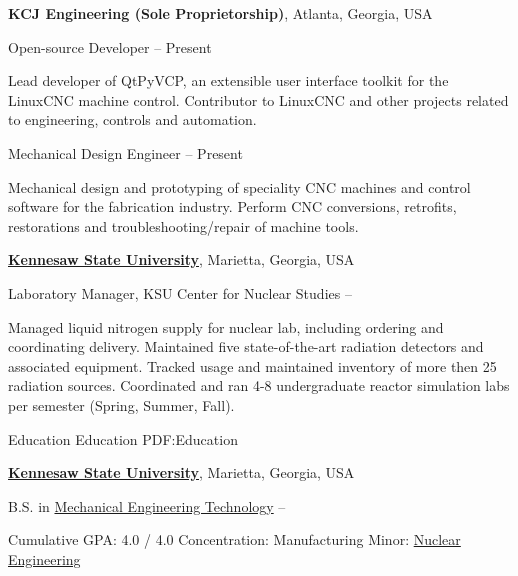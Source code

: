 \documentclass[
letterpaper,
MMMyyyy,
nonstopmode,
]{resume}
\begin{document}
\begin{Body}
\BigGap


\Entry
\textbf{KCJ Engineering (Sole Proprietorship)},
Atlanta, Georgia, USA

\Gap
\BulletItem
Open-source Developer
\hfill
{} --
Present
\begin{Detail}
\SubBulletItem
Lead developer of QtPyVCP, an extensible user interface toolkit for the LinuxCNC machine control.
\SubBulletItem
Contributor to LinuxCNC and other projects related to engineering, controls and automation.
\end{Detail}

\Gap
\BulletItem
Mechanical Design Engineer
\hfill
{} --
Present
\begin{Detail}
\SubBulletItem
Mechanical design and prototyping of speciality CNC machines and control software for the fabrication industry.
\SubBulletItem
Perform CNC conversions, retrofits, restorations and troubleshooting/repair of machine tools.
\end{Detail}

\BigGap

\Entry
\href{http://kennesaw.edu/}
{\textbf{Kennesaw State University}},
Marietta, Georgia, USA

\Gap
\BulletItem
Laboratory Manager,
KSU Center for Nuclear Studies
\hfill
{} --
\begin{Detail}
\SubBulletItem
Managed liquid nitrogen supply for nuclear lab, including ordering and coordinating delivery.
\SubBulletItem
Maintained five state-of-the-art radiation detectors and associated equipment.
\SubBulletItem
Tracked usage and maintained inventory of more then 25 radiation sources.
\SubBulletItem
Coordinated and ran 4-8 undergraduate reactor simulation labs per semester (Spring, Summer, Fall).
\end{Detail}



\Section
{Education}
{Education}
{PDF:Education}

\Entry
\href{http://www.kennesaw.edu/}
{\textbf{Kennesaw State University}},
Marietta, Georgia, USA

\Gap
\BulletItem
B.S. in
\href{http://engineering.kennesaw.edu/engineering-technology/}
{Mechanical Engineering Technology}
\hfill
{} --
\begin{Detail}
\SubBulletItem
Cumulative GPA: 4.0 / 4.0
\SubBulletItem
Concentration: Manufacturing
\SubBulletItem
Minor:
\href{http://engineering.kennesaw.edu/nuclear-studies/}
{Nuclear Engineering}
\end{Detail}



\end{Body}
\end{document}
